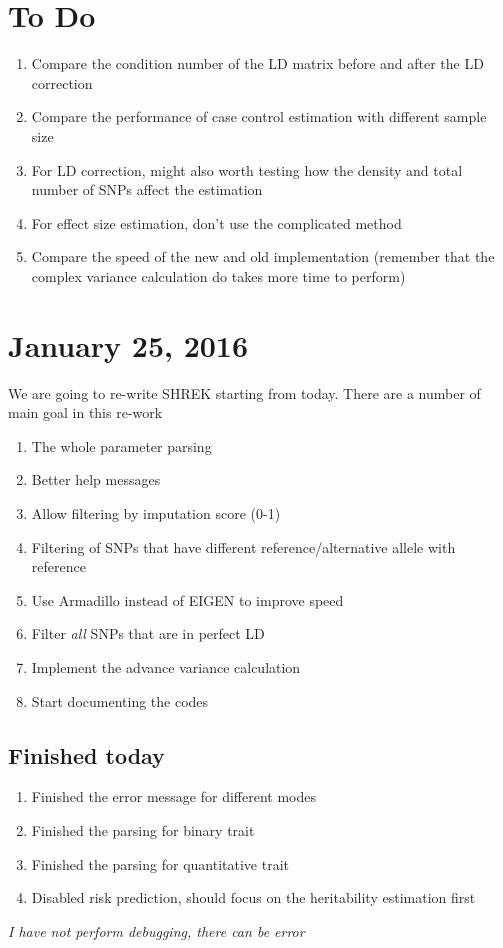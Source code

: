 \documentclass[12pt]{article}
\begin{document}
	\section{To Do}
	\begin{enumerate}
		\item Compare the condition number of the LD matrix before and after the LD correction
		\item Compare the performance of case control estimation with different sample size 
		\item For LD correction, might also worth testing how the density and total number of SNPs affect the estimation
		\item For effect size estimation, don't use the complicated method
		\item Compare the speed of the new and old implementation (remember that the complex variance calculation do takes more time to perform)
	\end{enumerate}
	
	
	
	\section{January 25, 2016}
	We are going to re-write SHREK starting from today. 
	There are a number of main goal in this re-work
	\begin{enumerate}
		\item The whole parameter parsing 
		\item Better help messages
		\item Allow filtering by imputation score (0-1)
		\item Filtering of SNPs that have different reference/alternative allele with reference
		\item Use Armadillo instead of EIGEN to improve speed
		\item Filter \emph{all} SNPs that are in perfect LD
		\item Implement the advance variance calculation 
		\item Start documenting the codes
	\end{enumerate}
	\subsection{Finished today}
	\begin{enumerate}
		\item Finished the error message for different modes
		\item Finished the parsing for binary trait
		\item Finished the parsing for quantitative trait
		\item Disabled risk prediction, should focus on the heritability estimation first
	\end{enumerate}
	\emph{I have not perform debugging, there can be error}
\end{document}

